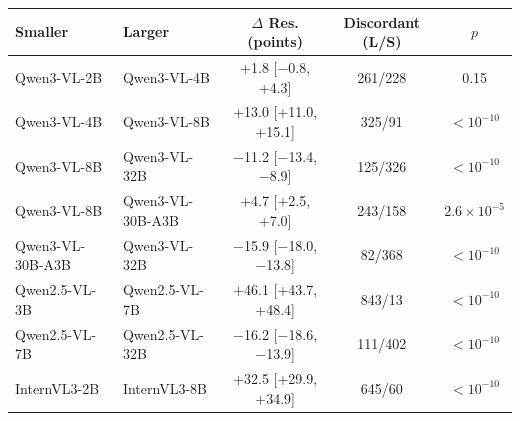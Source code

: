 \begin{tabular}{llccc}
\toprule
Smaller & Larger & $\Delta$ Res. (points) & Discordant (L/S) & $p$ \\
\midrule
Qwen3-VL-2B & Qwen3-VL-4B & +1.8 [$-$0.8, +4.3] & 261/228 & 0.15 \\
Qwen3-VL-4B & Qwen3-VL-8B & +13.0 [+11.0, +15.1] & 325/91 & $<10^{-10}$ \\
Qwen3-VL-8B & Qwen3-VL-32B & $-$11.2 [$-$13.4, $-$8.9] & 125/326 & $<10^{-10}$ \\
Qwen3-VL-8B & Qwen3-VL-30B-A3B & +4.7 [+2.5, +7.0] & 243/158 & $2.6\times10^{-5}$ \\
Qwen3-VL-30B-A3B & Qwen3-VL-32B & $-$15.9 [$-$18.0, $-$13.8] & 82/368 & $<10^{-10}$ \\
Qwen2.5-VL-3B & Qwen2.5-VL-7B & +46.1 [+43.7, +48.4] & 843/13 & $<10^{-10}$ \\
Qwen2.5-VL-7B & Qwen2.5-VL-32B & $-$16.2 [$-$18.6, $-$13.9] & 111/402 & $<10^{-10}$ \\
InternVL3-2B & InternVL3-8B & +32.5 [+29.9, +34.9] & 645/60 & $<10^{-10}$ \\
\bottomrule
\end{tabular}
